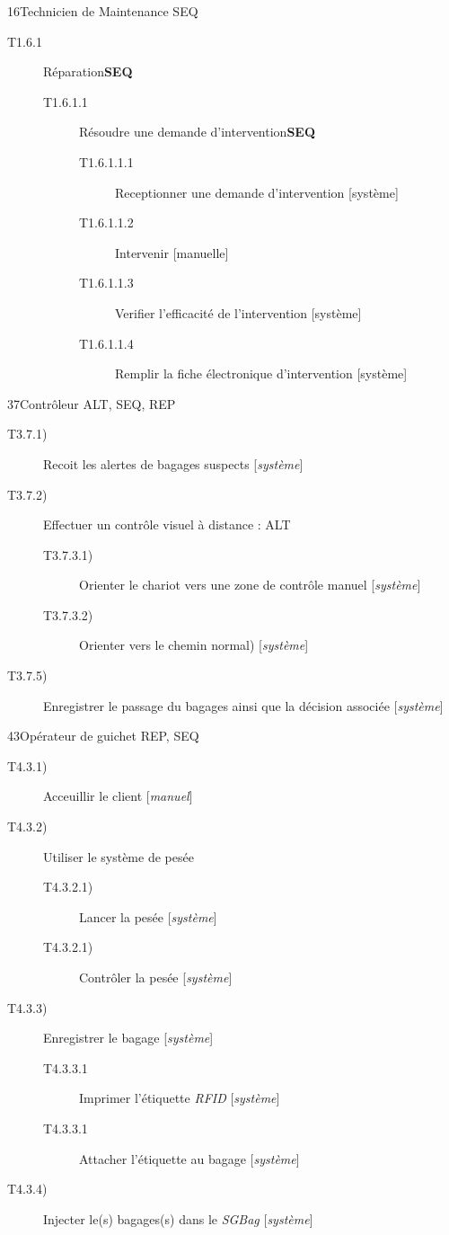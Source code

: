 {1}{6}{Technicien de Maintenance}
{SEQ}
{
\begin{description}
	\item[T1.6.1] Réparation\textbf{SEQ}
	\begin{description}
		\item[T1.6.1.1] Résoudre une demande d'intervention\textbf{SEQ}
		\begin{description}
			\item[T1.6.1.1.1] Receptionner une demande d'intervention [système]
			\item[T1.6.1.1.2] Intervenir [manuelle]
			\item[T1.6.1.1.3] Verifier l'efficacité de l'intervention [système]
			\item[T1.6.1.1.4] Remplir la fiche électronique d'intervention [système]
		\end{description}
	\end{description}
\end{description}
}

\dta
{3}{7}{Contrôleur}
{ALT, SEQ, REP}
{
\begin{description}
	\item [T3.7.1)] Recoit les alertes de bagages suspects [\textsl{système}]
	\item [T3.7.2)] Effectuer un contrôle visuel à distance : ALT
	\begin{description}
		\item [T3.7.3.1)] Orienter le chariot vers une zone de contrôle manuel [\textsl{système}]
		\item [T3.7.3.2)] Orienter vers le chemin \og normal\fg) [\textsl{système}]
	\end{description}
	\item [T3.7.5)] Enregistrer le passage du bagages ainsi que la décision associée [\textsl{système}]
\end{description}
}

\dta
{4}{3}{Opérateur de guichet}
{REP, SEQ}
{
\begin{description}
	\item [T4.3.1)] Acceuillir le client [\textsl{manuel}]
	\item [T4.3.2)] Utiliser le système de pesée
	\begin{description}
		\item [T4.3.2.1)] Lancer la pesée [\textsl{système}]
		\item [T4.3.2.1)] Contrôler la pesée [\textsl{système}]
	\end{description}
	\item [T4.3.3)] Enregistrer le bagage [\textsl{système}]
	\begin{description}
		\item [T4.3.3.1] Imprimer l'étiquette \textsl{RFID} [\textsl{système}]
		\item [T4.3.3.1] Attacher l'étiquette au bagage [\textsl{système}]
	\end{description}
	\item [T4.3.4)] Injecter le(s) bagages(s) dans le \textsl{SGBag}  [\textsl{système}]
\end{description}
}

